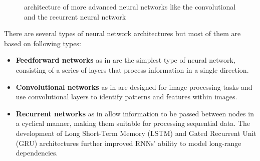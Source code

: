 \begin{figure}
    \begin{center}
        \hfill
    \end{center}
    \caption[advanced neural network architectures]{architecture of more advanced neural networks like the convolutional and the recurrent neural network}
    \label{fig:neural_network-architecture}
\end{figure}

There are several types of neural network architectures but most of them are based on following types: 
\begin{itemize}
	\item \textbf{Feedforward networks} as in  are the simplest type of neural network, consisting of a series of layers that process information in a single direction.
	\item \textbf{Convolutional networks} as in  are designed for image processing tasks and use convolutional layers to identify patterns and features within images. 
	\item \textbf{Recurrent networks} as in allow information to be passed between nodes in a cyclical manner, making them suitable for processing sequential data. The development of Long Short-Term Memory (LSTM) and Gated Recurrent Unit (GRU) architectures further improved RNNs' ability to model long-range dependencies.
\end{itemize}


